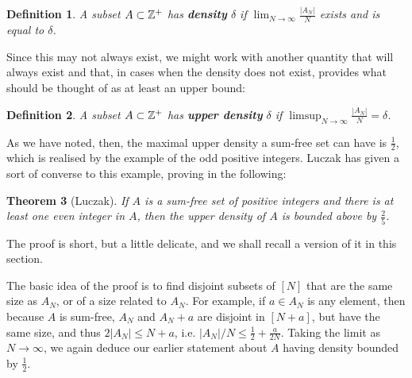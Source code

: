 \documentclass{report}
\newtheorem{theorem}{Theorem}[section]
\newtheorem{definition}[theorem]{Definition}
\theoremstyle{remark}
\numberwithin{equation}{section}
\begin{document}
\begin{definition}
  A subset $A \subset \mathbb{Z}^+$ has \textbf{density} $\delta$ if
  $\lim_{N \to \infty} \frac{|A_N|}{N}$ exists and is equal to
  $\delta$.
\end{definition}

Since this may not always exist, we might work with another quantity
that will always exist and that, in cases when the density does not
exist, provides what should be thought of as at least an upper bound:

\begin{definition}
  A subset $A \subset \mathbb{Z}^+$ has \textbf{upper density} $\delta$ if
  $\limsup_{N \to \infty}\frac{|A_N|}{N} = \delta$.
\end{definition}

As we have noted, then, the maximal upper density a sum-free set can
have is $\frac12$, which is realised by the example of the odd
positive integers.  Luczak has given a sort of converse to this
example, proving in \cite{luczak:jct1995} the following: 

\begin{theorem}[Luczak]
If $A$ is a sum-free set of positive integers and there is at least
one even integer in $A$, then the upper density of $A$ is bounded
above by $\frac25$.  
\end{theorem}  

The proof is short, but a
little delicate, and we shall recall a version of it in this section.

The basic idea of the proof is to find disjoint subsets of $[N]$ that
are the same size as $A_N$, or of a size related to $A_N$.  For
example, if $a \in A_N$ is any element, then because $A$ is sum-free,
$A_N$ and $A_N+a$ are disjoint in $[N+a]$, but have the same size, and
thus $2|A_N| \leq N+a$, i.e. $|A_N|/N \leq \frac12 + \frac{a}{2N}$.
Taking the limit as $N \to \infty$, we again deduce our earlier
statement about $A$ having density bounded by $\frac12$.
\end{document}
